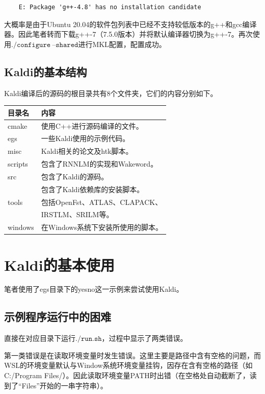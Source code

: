 \documentclass[a4paper]{article}
\begin{document}
\begin{lstlisting}
    E: Package 'g++-4.8' has no installation candidate
\end{lstlisting}

大概率是由于Ubuntu 20.04的软件包列表中已经不支持较低版本的g++和gcc编译器。因此笔者转而下载g++-7（7.5.0版本）并将默认编译器切换为g++-7。再次使用$\mathtt{./configure\ \text{--}shared}$进行MKL配置，配置成功。


\subsection{Kaldi的基本结构}
Kaldi编译后的源码的根目录共有8个文件夹，它们的内容分别如下。

\begin{table}[th]
  \centering
    \begin{tabular}{ll}
    \toprule
    目录名 & 内容 \\
    \midrule
    cmake & 使用C++进行源码编译的文件。\\
    egs & 一些Kaldi使用的示例代码。\\
    misc & Kaldi相关的论文及htk脚本。\\
    scripts & 包含了RNNLM的实现和Wakeword。\\
    src & 包含了Kaldi的源码。\\
     & 包含了Kaldi依赖库的安装脚本。\\
    tools& 包括OpenFst、ATLAS、CLAPACK、\\
    & IRSTLM、SRILM等。\\
    windows & 在Windows系统下安装所使用的脚本。\\
    \bottomrule
    \end{tabular}
\end{table}



\section{Kaldi的基本使用}
笔者使用了egs目录下的yesno这一示例来尝试使用Kaldi。

\subsection{示例程序运行中的困难}
直接在对应目录下运行$\mathtt{./run.sh}$，过程中显示了两类错误。

第一类错误是在读取环境变量时发生错误。这里主要是路径中含有空格的问题，而WSL的环境变量默认与Window系统环境变量挂钩，因存在含有空格的路径（如C:/Program Files/）。因此读取环境变量PATH时出错（在空格处自动截断了，读到了“Files”开始的一串字符串）。
\end{document}
